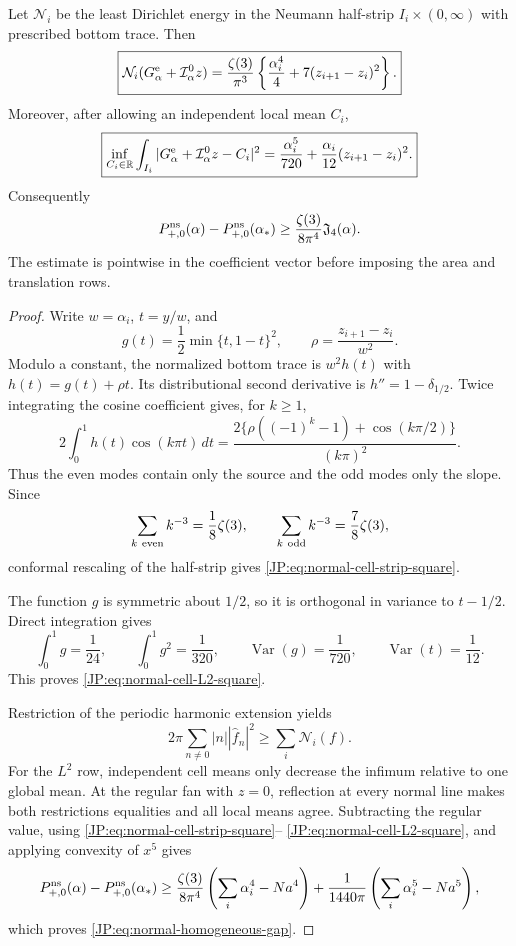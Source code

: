 \begin{lemma}
\label{JP:lem:normal-cell-square}
Let $\mathcal N_i$ be the least Dirichlet energy in the Neumann half-strip
$I_i\times(0,\infty)$ with prescribed bottom trace.  Then
\begin{equation}\label{JP:eq:normal-cell-strip-square}
 \boxed{
 \mathcal N_i(G_\alpha^{\rm e}+\mathcal I_\alpha^0z)
 =\frac{\zeta(3)}{\pi^3}
 \left\{\frac{\alpha_i^4}{4}
       +7(z_{i+1}-z_i)^2\right\}.}
\end{equation}
Moreover, after allowing an independent local mean $C_i$,
\begin{equation}\label{JP:eq:normal-cell-L2-square}
 \boxed{
 \inf_{C_i\in\mathbb R}\int_{I_i}
 |G_\alpha^{\rm e}+\mathcal I_\alpha^0z-C_i|^2
 =\frac{\alpha_i^5}{720}
  +\frac{\alpha_i}{12}(z_{i+1}-z_i)^2.}
\end{equation}
Consequently
\begin{equation}\label{JP:eq:normal-homogeneous-gap}
 P_{+,0}^{\rm ns}(\alpha)-P_{+,0}^{\rm ns}(\alpha_*)
 \ge \frac{\zeta(3)}{8\pi^4}\mathfrak J_4(\alpha).
\end{equation}
The estimate is pointwise in the coefficient vector before imposing the
area and translation rows.
\end{lemma}

\begin{proof}
Write $w=\alpha_i$, $t=y/w$, and
\[
 g(t)=\frac12\min\{t,1-t\}^2,
 \qquad \rho=\frac{z_{i+1}-z_i}{w^2}.
\]
Modulo a constant, the normalized bottom trace is
$w^2h(t)$ with $h(t)=g(t)+\rho t$.  Its distributional second derivative
is $h''=1-\delta_{1/2}$.  Twice integrating the cosine coefficient gives,
for $k\ge1$,
\[
 2\int_0^1h(t)\cos(k\pi t)\,dt
 =\frac{2\{\rho((-1)^k-1)+\cos(k\pi/2)\}}{(k\pi)^2}.
\]
Thus the even modes contain only the source and the odd modes only the
slope.  Since
\[
 \sum_{k\ {\rm even}}k^{-3}=\frac18\zeta(3),
 \qquad
 \sum_{k\ {\rm odd}}k^{-3}=\frac78\zeta(3),
\]
conformal rescaling of the half-strip gives
\eqref{JP:eq:normal-cell-strip-square}.

The function $g$ is symmetric about $1/2$, so it is orthogonal in variance
to $t-1/2$.  Direct integration gives
\[
 \int_0^1g=\frac1{24},\qquad
 \int_0^1g^2=\frac1{320},\qquad
 \operatorname {Var}(g)=\frac1{720},\qquad
 \operatorname {Var}(t)=\frac1{12}.
\]
This proves \eqref{JP:eq:normal-cell-L2-square}.

Restriction of the periodic harmonic extension yields
\[
 2\pi\sum_{n\ne0}|n||\widehat f_n|^2
 \ge\sum_i\mathcal N_i(f).
\]
For the $L^2$ row, independent cell means only decrease the infimum relative
to one global mean.  At the regular fan with $z=0$, reflection at every
normal line makes both restrictions equalities and all local means agree.
Subtracting the regular value, using \eqref{JP:eq:normal-cell-strip-square}--
\eqref{JP:eq:normal-cell-L2-square}, and applying convexity of $x^5$ gives
\[
 P_{+,0}^{\rm ns}(\alpha)-P_{+,0}^{\rm ns}(\alpha_*)
 \ge\frac{\zeta(3)}{8\pi^4}
       \left(\sum_i\alpha_i^4-Na^4\right)
 +\frac1{1440\pi}
       \left(\sum_i\alpha_i^5-Na^5\right),
\]
which proves \eqref{JP:eq:normal-homogeneous-gap}.
\end{proof}

